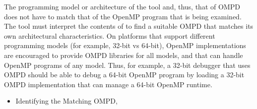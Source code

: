 The programming model or architecture of the tool and, thus, that of OMPD does 
not have to match that of the OpenMP program that is being examined. The tool
must interpret the contents of  to find a suitable OMPD 
that matches its own architectural characteristics. On platforms that support 
different programming models (for example, 32-bit vs 64-bit), OpenMP 
implementations are encouraged to provide OMPD libraries for all models, and 
that can handle OpenMP programs of any model. Thus, for example, a 32-bit 
debugger that uses OMPD should be able to debug a 64-bit OpenMP program by 
loading a 32-bit OMPD implementation that can manage a 64-bit OpenMP runtime.

\crossreferences
\begin{itemize}
	\item Identifying the Matching OMPD, 
\end{itemize}




